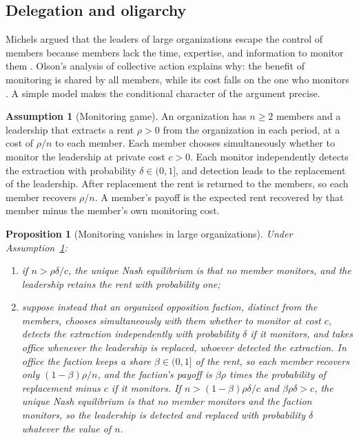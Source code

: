 \documentclass[11pt,letterpaper]{article}
\newtheorem{proposition}[theorem]{Proposition}
\theoremstyle{definition}
\newtheorem{assumption}[theorem]{Assumption}
\theoremstyle{remark}
\begin{document}
\subsection{Delegation and oligarchy}

Michels argued that the leaders of large organizations escape the control of members because members lack the time, expertise, and information to monitor them \citep{michels1915}. Olson's analysis of collective action explains why: the benefit of monitoring is shared by all members, while its cost falls on the one who monitors \citep{olson1965}. A simple model makes the conditional character of the argument precise.

\begin{assumption}[Monitoring game]
\label{ass:political-power:monitoring}
An organization has $n\ge2$ members and a leadership that extracts a rent $\rho>0$ from the organization in each period, at a cost of $\rho/n$ to each member. Each member chooses simultaneously whether to monitor the leadership at private cost $c>0$. Each monitor independently detects the extraction with probability $\delta\in(0,1]$, and detection leads to the replacement of the leadership. After replacement the rent is returned to the members, so each member recovers $\rho/n$. A member's payoff is the expected rent recovered by that member minus the member's own monitoring cost.
\end{assumption}

\begin{proposition}[Monitoring vanishes in large organizations]
\label{prop:political-power:michels}
Under Assumption~\ref{ass:political-power:monitoring}:
\begin{enumerate}[label=(\alph*)]
\item if $n>\rho\delta/c$, the unique Nash equilibrium is that no member monitors, and the leadership retains the rent with probability one;
\item suppose instead that an organized opposition faction, distinct from the members, chooses simultaneously with them whether to monitor at cost $c$, detects the extraction independently with probability $\delta$ if it monitors, and takes office whenever the leadership is replaced, whoever detected the extraction. In office the faction keeps a share $\beta\in(0,1]$ of the rent, so each member recovers only $(1-\beta)\rho/n$, and the faction's payoff is $\beta\rho$ times the probability of replacement minus $c$ if it monitors. If $n>(1-\beta)\rho\delta/c$ and $\beta\rho\delta>c$, the unique Nash equilibrium is that no member monitors and the faction monitors, so the leadership is detected and replaced with probability $\delta$ whatever the value of $n$.
\end{enumerate}
\end{proposition}
\end{document}
